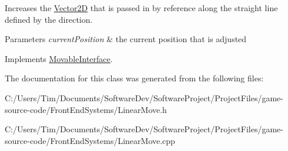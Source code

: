 Increases the \hyperlink{class_vector2_d}{Vector2D} that is passed in by reference along the straight line defined by the direction. 


\begin{DoxyParams}{Parameters}
{\em current\+Position} & the current position that is adjusted \\
\hline
\end{DoxyParams}


Implements \hyperlink{class_movable_interface_a899cc1c78eacbee13b906c6770e7f025}{Movable\+Interface}.



The documentation for this class was generated from the following files\+:\begin{DoxyCompactItemize}
\item 
C\+:/\+Users/\+Tim/\+Documents/\+Software\+Dev/\+Software\+Project/\+Project\+Files/game-\/source-\/code/\+Front\+End\+Systems/Linear\+Move.\+h\item 
C\+:/\+Users/\+Tim/\+Documents/\+Software\+Dev/\+Software\+Project/\+Project\+Files/game-\/source-\/code/\+Front\+End\+Systems/Linear\+Move.\+cpp\end{DoxyCompactItemize}
